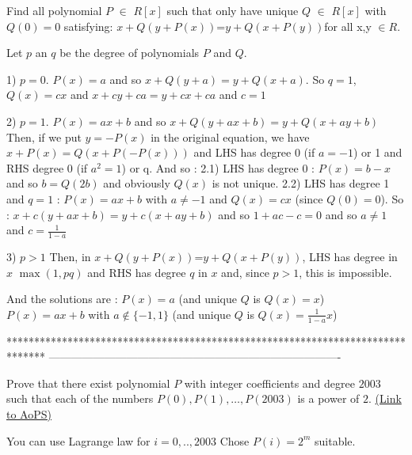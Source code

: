 \begin{solution}
	\begin{tcolorbox}Find all polynomial $ P$  $ \in$ $ R[x]$ such that only have unique $ Q$ $ \in$ $ R[x]$ with $ Q(0) = 0$ satisfying:
     $ x+Q(y+P(x))$=$ y+Q(x+P(y))$for all x,y $ \in$$ R$.\end{tcolorbox}

Let $ p$ an $ q$ be the degree of polynomials $ P$ and $ Q$.

1) $ p=0$. $ P(x)=a$ and so $ x+Q(y+a)=y+Q(x+a)$. So $ q=1$, $ Q(x)=cx$ and $ x+cy+ca=y+cx+ca$ and $ c=1$

2) $ p=1$. $ P(x)=ax+b$ and so $ x+Q(y+ax+b)=y+Q(x+ay+b)$
Then, if we put $ y=-P(x)$ in the original equation, we have $ x+P(x) = Q(x+P(-P(x)))$ and LHS has degree 0 (if $ a=-1$) or 1 and RHS degree 0 (if $ a^{2}=1$) or q. And so :
2.1) LHS has degree 0 : $ P(x)=b-x$ and so $ b=Q(2b)$ and obviously $ Q(x)$ is not unique.
2.2) LHS has degree 1 and $ q=1$ : $ P(x)=ax+b$ with $ a\neq-1$ and $ Q(x)=cx$ (since $ Q(0)=0$). So :
$ x+c(y+ax+b)=y+c(x+ay+b)$ and so $ 1+ac-c=0$ and so $ a\neq 1$ and $ c=\frac{1}{1-a}$

3) $ p>1$
Then, in $ x+Q(y+P(x))$=$ y+Q(x+P(y))$, LHS has degree in $ x$ $ \max(1,pq)$ and RHS has degree $ q$ in $ x$ and, since $ p>1$, this is impossible.

And the solutions are :
$ P(x)=a$ (and unique $ Q$ is $ Q(x)=x$)
$ P(x)=ax+b$ with $ a\notin\{-1,1\}$ (and unique $ Q$ is $ Q(x)=\frac{1}{1-a}x$)
\end{solution}
*******************************************************************************
-------------------------------------------------------------------------------

\begin{problem}
	Prove that there exist polynomial $ P$ with integer coefficients and degree $2003$ such that each of the numbers $P(0),P(1), \ldots,P(2003)$ is a power of $2$.
	\flushright \href{https://artofproblemsolving.com/community/c6h166608}{(Link to AoPS)}
\end{problem}



\begin{solution}
	You can use Lagrange law for $ i=0,..,2003$
Chose $ P(i)=2^{m}$ suitable.
\end{solution}



